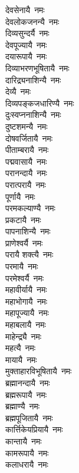 \begin{flushleft}
\begin{multicols}{2}
देवसेनायै~नमः\\
देवलोकजनन्यै~नमः\\
दिव्यसुन्दर्यै~नमः\\
देवपूज्यायै~नमः\\
दयारूपायै~नमः\\
दिव्याभरणभूषितायै~नमः\\
दारिद्र्यनाशिन्यै~नमः\\
देव्यै~नमः\\
दिव्यपङ्कजधारिण्यै~नमः\\
दुःस्वप्ननाशिन्यै~नमः\hfill{}\\
दुष्टशमन्यै~नमः\\
दोषवर्जितायै~नमः\\
पीताम्बरायै~नमः\\
पद्मवासायै~नमः\\
परानन्दायै~नमः\\
परात्परायै~नमः\\
पूर्णायै~नमः\\
परमकल्याण्यै~नमः\\
प्रकटायै~नमः\\
पापनाशिन्यै~नमः\hfill{}\\
प्राणेश्वर्यै~नमः\\
परायै शक्त्यै~नमः\\
परमायै~नमः\\
परमेश्वर्यै~नमः\\
महावीर्यायै~नमः\\
महाभोगायै~नमः\\
महापूज्यायै~नमः\\
महाबलायै~नमः\\
माहेन्द्र्यै~नमः\\
महत्यै~नमः\hfill{}\\
मायायै~नमः\\
मुक्ताहारविभूषितायै~नमः\\
ब्रह्मानन्दायै~नमः\\
ब्रह्मरूपायै~नमः\\
ब्रह्माण्यै~नमः\\
ब्रह्मपूजितायै~नमः\\
कार्त्तिकेयप्रियायै~नमः\\
कान्तायै~नमः\\
कामरूपायै~नमः\\
कलाधरायै~नमः\hfill{}\\

\end{multicols}
\end{flushleft}

